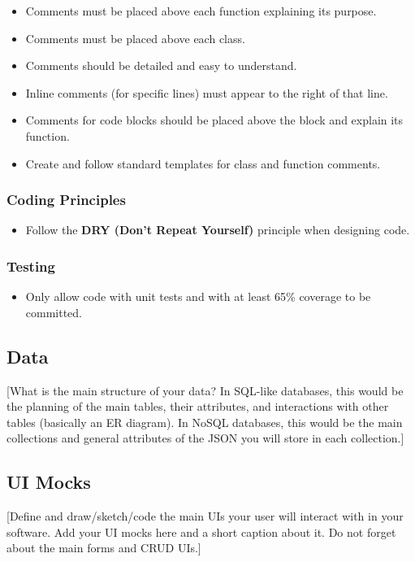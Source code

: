 \documentclass{article}
\begin{document}
\begin{itemize}
    \item Comments must be placed above each function explaining its purpose.
    \item Comments must be placed above each class.
    \item Comments should be detailed and easy to understand.
    \item Inline comments (for specific lines) must appear to the right of that line.
    \item Comments for code blocks should be placed above the block and explain its function.
    \item Create and follow standard templates for class and function comments.
\end{itemize}

\subsubsection{Coding Principles}

\begin{itemize}
    \item Follow the \textbf{DRY (Don't Repeat Yourself)} principle when designing code.
\end{itemize}
\subsubsection{Testing}
    \begin{itemize}
    \item Only allow code with unit tests and with at least 65\% coverage to be committed.
\end{itemize}

\subsection{Data}
[What is the main structure of your data? In SQL-like databases, this would be the planning of the main tables, their attributes, and interactions with other tables (basically an ER diagram). In NoSQL databases, this would be the main collections and general attributes of the JSON you will store in each collection.]

\subsection{UI Mocks}
[Define and draw/sketch/code the main UIs your user will interact with in your software. Add your UI mocks here and a short caption about it. Do not forget about the main forms and CRUD UIs.]
\end{document}
